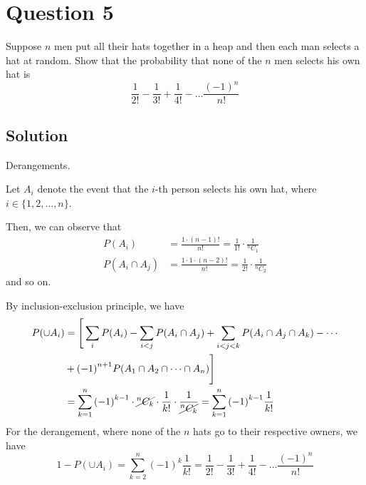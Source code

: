 \section*{Question 5}

Suppose \(n\) men put all their hats together in a heap and then each man selects a hat at random.
Show that the probability that none of the \(n\) men selects his own hat is
\[
    \frac{1}{2!} - \frac{1}{3!} + \frac{1}{4!} - \dots \frac{{(-1)}^n}{n!}
\]

\subsection*{Solution}

Derangements.

Let \( A_i \) denote the event that the \( i \)-th person selects his own hat, where \( i \in \{1, 2, \dots, n\} \).

Then, we can observe that
\begin{align*}
    P(A_i)
     & =
    \frac{1 \cdot (n-1)!}{n!}
    =
    \frac{1}{1!} \cdot \frac{1}{{}^n C_1}
    \\
    P(A_i \cap A_j)
     & =
    \frac{1 \cdot 1 \cdot (n-2)!}{n!}
    =
    \frac{1}{2!} \cdot \frac{1}{{}^n C_2}
\end{align*}
and so on.

By inclusion-exclusion principle, we have
\begin{align*}
    P(\cup A_i)
     & =
    \Bigg[
    \sum_{i} P(A_i)
    - \sum_{i < j} P(A_i \cap A_j)
    +
    \sum_{i < j < k} P(A_i \cap A_j \cap A_k)
    -
    \cdots
    \\ & +
    {(-1)}^{n+1} P(A_1 \cap A_2 \cap \dots \cap A_n)
    \Bigg]
    \\
     & =
    \sum_{k=1}^{n} {(-1)}^{k-1} \cdot \cancel{{}^n C_k} \cdot \frac{1}{k!} \cdot \frac{1}{\cancel{{}^n C_k}}
    =
    \sum_{k=1}^{n} {(-1)}^{k-1} \frac{1}{k!}
\end{align*}
For the derangement, where none of the \( n \) hats go to their respective owners, we have
\[
    1 - P(\cup A_i)
    =
    \boxed{
        \sum_{k=2}^{n} {(-1)}^k \frac{1}{k!}
    }
    =
    \boxed{
        \frac{1}{2!} - \frac{1}{3!} + \frac{1}{4!} - \dots \frac{{(-1)}^n}{n!}
    }
\]
